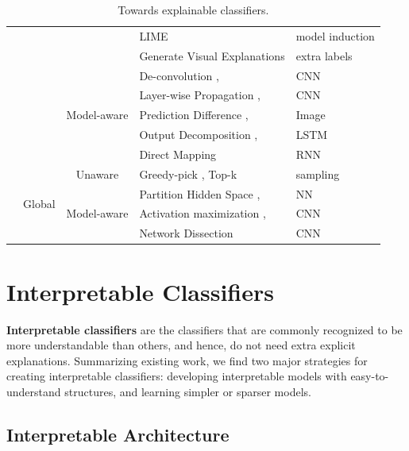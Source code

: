 \begin{table}[hb]
\begin{tabular}{ |c|c|c|p{15em}|p{7.5em}| }
  \cline{4-5}
  & & & LIME \cite{ribeiro2016kdd} & model induction \\ 
  \cline{4-5}
  & & & Generate Visual Explanations \cite{hendricks16generate} & extra labels \\ 
  \cline{3-5}
  & & \multirow{5}{4em}{\centering Model-aware}
  & De-convolution \cite{zeiler2014eccv}, & CNN \\
  & & & Layer-wise Propagation \cite{bach15plos}, & CNN \\
  & & & Prediction Difference \cite{zintgraf17visualize}, & Image \\
  & & & Output Decomposition \cite{murdoch2017rule}, & LSTM \\
  & & & Direct Mapping \cite{karpathy16rnn} & RNN \\
  \cline{2-5}
  & \multirow{4}{3em}{\centering Global} & \multirow{1}{4em}{\centering Unaware}
  & Greedy-pick \cite{ribeiro2016kdd}, Top-k \cite{zeiler2014eccv} & sampling  \\ 
  \cline{3-5}
  & & \multirow{3}{4em}{\centering Model-aware}
  & Partition Hidden Space \cite{feraud2002nn,rauber2017hidden-activity}, & NN \\
  & & & Activation maximization \cite{erhan2009techreport, simonyan14saliency}, & CNN \\
  & & & Network Dissection \cite{bau2017netdissect} & CNN \\
  \hline
\end{tabular}
\caption{Towards explainable classifiers.}
\label{tab:explainable-methods}
\end{table}

\section{Interpretable Classifiers}\label{sec:interpretable-classifier}

\textbf{Interpretable classifiers} are the classifiers that are commonly recognized to be more understandable than others, and hence, do not need extra explicit explanations. Summarizing existing work, we find two major strategies for creating interpretable classifiers: developing interpretable models with easy-to-understand structures, and learning simpler or sparser models.

\subsection{Interpretable Architecture}

